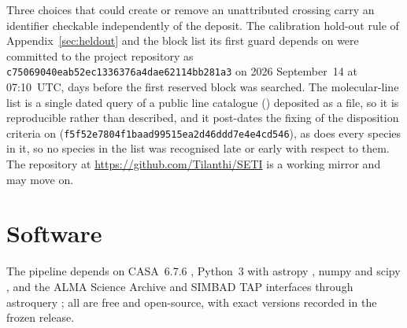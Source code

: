 Three choices that could create or remove an unattributed crossing carry
an identifier checkable independently of the deposit. The
calibration hold-out rule of Appendix~\ref{sec:heldout} and the block list
its first guard depends on were committed to the project repository as
\texttt{c75069040eab52ec1336376a4dae62114bb281a3} on 2026 September~14 at
07:10~UTC, \HoLeadBlockDays{} days before the first reserved block was
searched. The molecular-line list is a single dated query of a public line
catalogue (\McQueryDate) deposited as a file, so it is reproducible rather
than described, and it post-dates the fixing of the disposition criteria on
\MkCritDate{} (\texttt{f5f52e7804f1baad99515ea2d46ddd7e4e4cd546}), as does
every species in it, so no species in the list was recognised late or early
with respect to them. The repository at
\url{https://github.com/Tilanthi/SETI} is a working mirror and may move on.

\section*{Software}
The pipeline depends on CASA~6.7.6 \citep[casatools/casatasks
6.7.6-14;][]{CASA2022}, Python~3 with astropy \citep{Astropy2022}, numpy
\citep{Harris2020} and scipy \citep{Virtanen2020}, and the ALMA Science
Archive and SIMBAD TAP interfaces through astroquery \citep{Ginsburg2019};
all are free and open-source, with exact
versions recorded in the frozen release.
